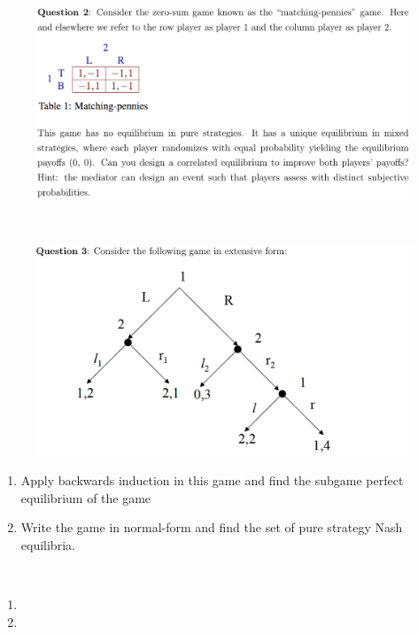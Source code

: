 \documentclass[12pt]{article}
\newenvironment{solution}[2][Solution]{\begin{trivlist}
\item[\hskip \labelsep {\bfseries #1}]}{\end{trivlist}}
\begin{document}
\begin{figure}[h!]
\includegraphics[width=\linewidth]{./assets/201806021725.png}
\end{figure}

\begin{solution}{}~\\

\end{solution}

\begin{figure}[h!]
\includegraphics[width=\linewidth]{./assets/201806021726.png}
\end{figure}
\begin{enumerate}[label=(\alph*)]
\item Apply backwards induction in this game and find the subgame perfect equilibrium of the game
\item Write the game in normal-form and find the set of pure strategy Nash equilibria.
\end{enumerate}

\begin{solution}{}~\\
\begin{enumerate}[label=(\alph*)]
\item 
\item
\end{enumerate}
\end{solution}
\end{document}
